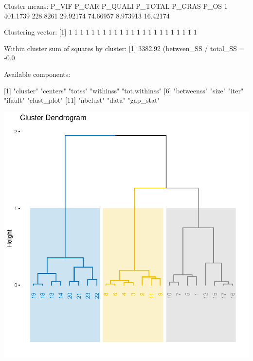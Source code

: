 \documentclass[a4paper]{article}
\begin{document}
\begin{Schunk}
\begin{Soutput}
Cluster means:
     P_VIF    P_CAR  P_QUALI  P_TOTAL   P_GRAS     P_OS
1 401.1739 228.8261 29.92174 74.66957 8.973913 16.42174

Clustering vector:
 [1] 1 1 1 1 1 1 1 1 1 1 1 1 1 1 1 1 1 1 1 1 1 1 1

Within cluster sum of squares by cluster:
[1] 3382.92
 (between_SS / total_SS =  -0.0 %

Available components:

 [1] "cluster"      "centers"      "totss"        "withinss"     "tot.withinss"
 [6] "betweenss"    "size"         "iter"         "ifault"       "clust_plot"  
[11] "nbclust"      "data"         "gap_stat"    
\end{Soutput}
\end{Schunk}
\includegraphics{TP3_M1MAS-006}
\end{document}
